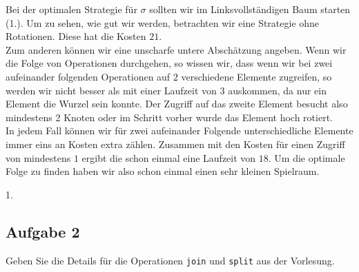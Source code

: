 \documentclass[11pt,a4paper,ngerman]{article}
\begin{document}
Bei der optimalen Strategie für $\sigma$ sollten wir im Linksvollständigen Baum starten (1.). Um zu sehen, wie gut wir werden,
betrachten wir eine Strategie ohne Rotationen. Diese hat die Kosten $21$.\\

Zum anderen können wir eine unscharfe untere Abschätzung angeben. Wenn wir die Folge von Operationen durchgehen, so wissen wir, 
dass wenn wir bei zwei aufeinander folgenden Operationen auf $2$ verschiedene Elemente zugreifen, so werden wir nicht besser als mit einer  Laufzeit von $3$ auskommen,
da nur ein Element die Wurzel sein konnte. Der Zugriff auf das zweite Element besucht also mindestens 2 Knoten oder im Schritt vorher wurde das Element hoch rotiert.\\

In jedem Fall können wir für zwei aufeinander Folgende unterschiedliche Elemente immer eins an Kosten extra zählen. Zusammen mit den Kosten für einen Zugriff von mindestens
$1$ ergibt die schon einmal eine Laufzeit von $18$. Um die optimale Folge zu finden haben wir also schon einmal einen sehr kleinen Spielraum.

\begin{center}
   1.
\end{center}

\subsection*{Aufgabe 2}

Geben Sie die Details für die Operationen \lstinline|join| und \lstinline|split| aus der Vorlesung.
\end{document}
